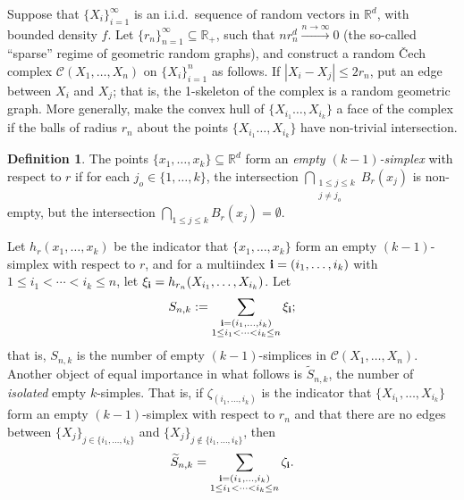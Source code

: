 \documentclass{amsart}
\theoremstyle{definition}
\newtheorem{definition}[thm]{Definition}
\newcommand{\R}{\mathbb{R}}
\newcommand{\ds}{\displaystyle}
\newcommand{\s}{\widetilde{S}}
\renewcommand{\1}{\mathbb{1}}
\begin{document}
Suppose that $\{X_i\}_{i=1}^\infty$ is an i.i.d.\ sequence of random
vectors in $\R^d$, with bounded density $f$.  Let
$\{r_n\}_{n=1}^\infty\subseteq\R_+$, such that $nr_n^d\xrightarrow{n
  \to\infty}0$ (the so-called ``sparse'' regime of geometric random 
graphs), and construct a
random \v{C}ech complex $\mathcal{C}(X_1,\ldots,X_n)$ on
$\{X_i\}_{i=1}^n$ as follows.  If $|X_i-X_j|\le2r_n$, put an edge
between $X_i$ and $X_j$; that is,  
the 1-skeleton of the complex is a
random geometric graph. More generally, make the convex hull of $\{X_{i_1}\ldots,X_{i_k}\}$
a face of the complex  
if the balls of 
radius $r_n$ about the points $\{X_{i_1}\ldots,X_{i_k}\}$ have non-trivial
intersection.

\begin{definition}
The points $\{x_1,\ldots,x_k\}\subseteq\R^d$ form an
{\it empty $( k-1)$-simplex} with respect to $r$ if for each
$j_o\in\{1,\ldots,k\}$, the intersection $\ds\bigcap_{\substack{1\le
    j\le k\\j\neq j_o}}B_{r}(x_j)$ is non-empty, but the intersection
$\ds\bigcap_{1\le j\le k}B_{r}(x_j)=\emptyset.$
\end{definition}
 Let
$h_r(x_1,\ldots,x_k)$ be the indicator that $\{x_1,\ldots,x_k\}$ form
an empty $( k-1)$-simplex with respect to $r$, and for a multiindex ${\bf
  i}=(i_1,\ldots,i_k)$ with $1\le i_1<\cdots<i_k\le n$, let $\xi_{\bf
  i}=h_{r_n}(X_{i_1},\ldots,X_{i_k})$. 
Let 
$$S_{n,k}:=\sum_{\substack{{\bf i}=(i_1,\ldots,i_k)\\1\le i_1<\cdots<i_k\le n}}
\xi_{\bf i};$$
that is, $S_{n,k}$ is the number of empty $(k-1)$-simplices in $
\mathcal{C}(X_1,\ldots,X_n).$  
Another object of equal importance in what follows is $\s_{n,k}$, 
the number of {\it isolated}
empty $k$-simples.  That is, if $\zeta_{(i_1,\ldots,i_k)}$ is the indicator
that $\{X_{i_1},\ldots,X_{i_k}\}$ form an empty $( k-1)$-simplex with respect to $r_n$
and that there are no edges between $\{X_j\}_{j\in\{i_1,\ldots,i_k\}}$ and 
$\{X_j\}_{j\notin\{i_1,\ldots,i_k\}}$, then 
$$\s_{n,k}=\sum_{\substack{{\bf i}=(i_1,\ldots,i_k)\\1\le i_1<\cdots<i_k\le n}}
\zeta_{\bf i}.$$
\end{document}
